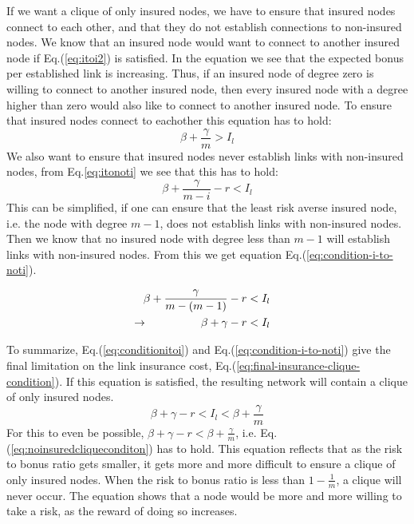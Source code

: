 If we want a clique of only insured nodes, we have to ensure that insured nodes connect to each other, and that they do not establish connections to non-insured nodes.
We know that an insured node would want to connect to another insured node if  Eq.(\ref{eq:itoi2}) is satisfied. 
In the equation we see that the expected bonus per established link is increasing. Thus, if an insured node of degree zero is willing to connect to another insured node, then every insured node with a degree higher than zero would also like to connect to another insured node. To ensure that insured nodes connect to eachother this equation has to hold:
\begin{equation}
\beta+\frac{\gamma}{m}>I_{l}
\label{eq:conditionitoi}
\end{equation}
We also want to ensure that insured nodes never establish links with non-insured nodes, from Eq.\ref{eq:itonoti} we see that this has to hold:
\begin{equation}
\beta+\frac{\gamma}{m-i}-r < I_{l}
\label{eq:conditionitonoti}
\end{equation}
This can be simplified, if one can ensure that the least risk averse insured node, i.e. the node with degree $m-1$, does not establish links with non-insured nodes. Then we know that no insured node with degree less than $m-1$ will establish links with non-insured nodes. From this we get equation Eq.(\ref{eq:condition-i-to-noti}).

\begin{eqnarray}
\beta+\frac{\gamma}{m-(m-1)}-r&<I_{l} \nonumber\\
\llap{$\rightarrow$\hspace{50pt}} \beta+\gamma-r&<I_{l}
\label{eq:condition-i-to-noti}
\end{eqnarray}

To summarize, Eq.(\ref{eq:conditionitoi}) and Eq.(\ref{eq:condition-i-to-noti}) give the final limitation on the link insurance cost, Eq.(\ref{eq:final-insurance-clique-condition}). If this equation is satisfied, the resulting network will contain a clique of only insured nodes.
\begin{equation}
\beta+\gamma-r<I_{l}<\beta+\frac{\gamma}{m}
\label{eq:final-insurance-clique-condition}
\end{equation}
For this to even be possible, $\beta+\gamma-r<\beta+\frac{\gamma}{m}$, i.e. Eq.(\ref{eq:noinsuredcliqueconditon}) has to hold. This equation reflects that as the risk to bonus ratio gets smaller, it gets more and more difficult to ensure a clique of only insured nodes. When the risk to bonus ratio is less than $1-\frac{1}{m}$, a clique will never occur. The equation shows that a node would be more and more willing to take a risk, as the reward of doing so increases.

